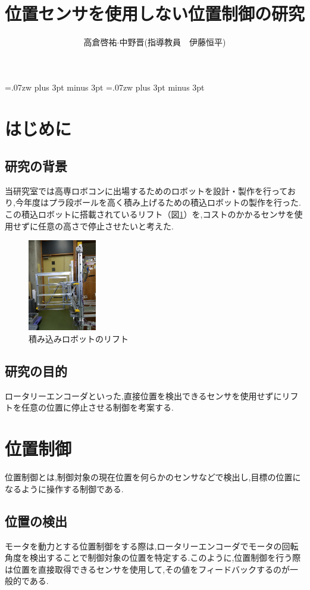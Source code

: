 \documentclass[twocolumn,11pt]{abst}
\title{位置センサを使用しない位置制御の研究}
\author{高倉啓祐$\cdot$中野晋(指導教員　伊藤恒平)}
\begin{document}
\maketitle
\thispagestyle{fancy}
\pagestyle{fancy}

\setlength{\baselineskip}{5.6truemm}
\kanjiskip=.07zw plus 3pt minus 3pt
\xkanjiskip=.07zw plus 3pt minus 3pt



\section{はじめに}
\subsection{研究の背景}
当研究室では高専ロボコンに出場するためのロボットを設計・製作を行っており,今年度はプラ段ボールを高く積み上げるための積込ロボットの製作を行った.この積込ロボットに搭載されているリフト（図\ref{fig:lift}）を,コストのかかるセンサを使用せずに任意の高さで停止させたいと考えた.

\begin{figure}[htbp]
  \begin{center}
    \includegraphics[width=30mm]{img/lift.jpg}
    \end{center}
  \caption{積み込みロボットのリフト}
 \label{fig:lift}
\end{figure}

\subsection{研究の目的}
ロータリーエンコーダといった,直接位置を検出できるセンサを使用せずにリフトを任意の位置に停止させる制御を考案する.

\section{位置制御}
位置制御とは,制御対象の現在位置を何らかのセンサなどで検出し,目標の位置になるように操作する制御である.

\subsection{位置の検出}
モータを動力とする位置制御をする際は,ロータリーエンコーダでモータの回転角度を検出することで制御対象の位置を特定する.このように,位置制御を行う際は位置を直接取得できるセンサを使用して,その値をフィードバックするのが一般的である.
\end{document}
